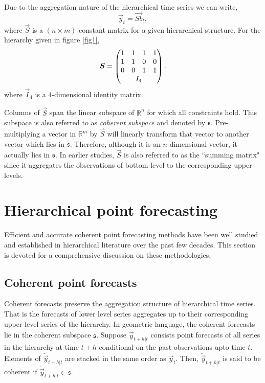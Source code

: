 \documentclass[graybox]{svmult}
\begin{document}
Due to the aggregation nature of the hierarchical time series we can write,
\begin{equation}
\vec{y}_t = \vec{Sb}_t,
\end{equation}
where $\vec{S}$ is a $(n \times m)$ constant matrix for a given hierarchical structure. For the hierarchy given in figure \ref{fig1}, 
\begin{equation}
\vec{S} = \begin{pmatrix} 
1& 1& 1& 1  \\ 
1& 1& 0& 0 \\   
0& 0& 1& 1 \\ 
& \multicolumn{2}{c}{I_4} &   
\end{pmatrix}. 
\end{equation} 
where $\vec{I}_4$ is a $4$-dimensional identity matrix.

Columns of $\vec{S}$ span the linear subspace of $\mathbb{R}^n$ for which all constraints hold. This subspace is also referred to as \textit{coherent subspace} and denoted by $\mathfrak{s}$. Pre-multiplying a vector in $\mathbb{R}^m$ by $\vec{S}$ will linearly transform that vector to another vector which lies in $\mathfrak{s}$. Therefore, although it is an $n$-dimensional vector, it actually lies in $\mathfrak{s}$. In earlier studies, $\vec{S}$ is also referred to as the ``summing matrix" since it aggregates the observations of bottom level to the corresponding upper levels.  


\section{Hierarchical point forecasting}

Efficient and accurate coherent point forecasting methods have been well studied and established in hierarchical literature over the past few decades. This section is devoted for a comprehensive discussion on these methodologies. 

\subsection{Coherent point forecasts}

Coherent forecasts preserve the aggregation structure of hierarchical time series. That is the forecasts of lower level series aggregates up to their corresponding upper level series of the hierarchy. In geometric language, the coherent forecasts lie in the coherent subspace $\mathfrak{s}$. Suppose $\breve{\vec{y}}_{t+h|t}$ consists point forecasts of all series in the hierarchy at time $t+h$ conditional on the past observations upto time $t$. Elements of $\breve{\vec{y}}_{t+h|t}$ are stacked in the same order as $\vec{y}_t$. Then, $\breve{\vec{y}}_{t+h|t}$ is said to be coherent  if $\breve{\vec{y}}_{t+h|t} \in \mathfrak{s}$. 
\end{document}
